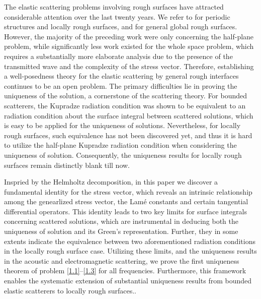 \documentclass[final,reqno]{siamltex}
\begin{document}
The elastic scattering problems involving rough surfaces have attracted considerable attention over the last twenty years. We refer to \cite{TA99a,TA99,MIJ11,JG10,GXY18} for periodic structures and locally rough surfaces, and \cite{TA01,TA02,JG12} for general global rough surfaces. However, the majority of the preceding work were only concerning the half-plane problem, while significantly less work existed for the whole space problem, which requires a substantially more elaborate analysis due to the presence of the transmitted wave and the complexity of the stress vector. Therefore, establishing a well-posedness theory for the elastic scattering by general rough interfaces continues to be an open problem. The primary difficulties lie in proving the uniqueness of the solution, a cornerstone of the scattering theory. For bounded scatterers, the Kupradze radiation condition was shown to be equivalent to an radiation condition about the surface integral between scattered solutions, which is easy to be applied for the uniqueness of solutions. Nevertheless, for locally rough surfaces, such equivalence has not been discovered yet, and thus it is hard to utilize the half-plane Kupradze radiation condition when considering the uniqueness of solution. Consequently, the uniqueness results for locally rough surfaces remain distinctly blank till now. 

Inspried by the Helmholtz decomposition, in this paper we discover a fundamental identity for the stress vector, which reveals an intrinsic relationship among the genearlized stress vector, the Lamé constants and certain tangential differential operators. This identity leads to two key limits for surface integrals concerning scattered solutions, which are instrumental in deducing both the uniqueness of solution and its Green's representation. Further, they in some extents indicate the equivalence between two aforementioned radiation conditions in the locally rough surface case. Utilizing these limits, and the uniqueness results in the acoustic and electromagnetic scattering, we prove the first uniqueness theorem of problem \eqref{1.1}--\eqref{1.3} for all frequencies. Furthermore, this framework enables the systematic extension of substantial uniqueness results from bounded elastic scatterers to locally rough surfaces.. 
\end{document}
